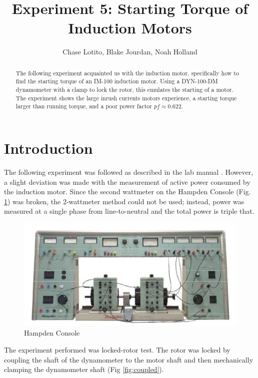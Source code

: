 \documentclass{IEEEtran}
\title{Experiment 5: Starting Torque of Induction Motors}
\author{Chase Lotito, Blake Jourdan, Noah Holland}
\date{}
\begin{document}
\maketitle

\begin{abstract}
    The following experiment acquainted us with the induction motor, specifically how to find the starting torque of an IM-100 induction motor. Using a DYN-100-DM dynamometer with a clamp to lock the rotor, this emulates the starting of a motor. The experiment shows the large inrush currents motors experience, a starting torque larger than running torque, and a poor power factor \(pf\approx 0.622\).  
\end{abstract}

\section{Introduction}

The following experiment was followed as described in the lab manual \cite{labmanual}. However, a slight deviation was made with the measurement of active power consumed by the induction motor. Since the second wattmeter on the Hampden Console (Fig. \ref{fig:console}) was broken, the 2-wattmeter method could not be used; instead, power was measured at a single phase from line-to-neutral and the total power is triple that.


\begin{figure}[h!]
    \includegraphics[width=\columnwidth]{console.png}
    \caption{Hampden Console}
    \centering
    \label{fig:console}
\end{figure}

The experiment performed was locked-rotor test. The rotor was locked by coupling the shaft of the dynamometer to the motor shaft and then mechanically clamping the dynamometer shaft (Fig \ref{fig:coupled}).
\end{document}
